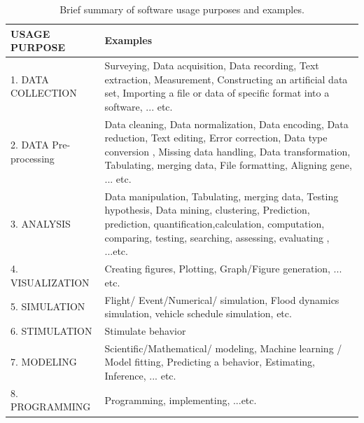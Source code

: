 \begin{table}
	\caption{Brief summary of software usage purposes and examples.}
	\begin{tabularx}{\textwidth}
		{|>{\setlength\hsize{.6\hsize}\setlength\linewidth{\hsize}}X|>{\setlength\hsize{1.4\hsize}\setlength\linewidth{\hsize}}X|}
		
		\hline
		USAGE PURPOSE & Examples  \\
		\hline
		1. DATA COLLECTION    &
		 
		Surveying, Data acquisition, Data recording, Text extraction, Measurement, Constructing an artificial data set, Importing a file or data of specific format into a software, ... etc.    \\
		\hline
		2. DATA Pre-processing    &
		
		Data cleaning, Data normalization,  Data encoding, Data reduction, Text editing, Error correction, Data type conversion , Missing data handling, Data transformation, Tabulating, merging data, File formatting, Aligning gene, ... etc.  \\
		\hline
		3. ANALYSIS    &
			
		Data manipulation, Tabulating, merging data, Testing hypothesis, Data mining,  clustering, Prediction, prediction, quantification,calculation, computation, comparing, testing, searching, assessing,  evaluating , ...etc. \\
		\hline
		
		4. VISUALIZATION    &
		
		Creating figures, Plotting, Graph/Figure generation, ... etc.		 \\
		\hline
		
		5. SIMULATION    &
		
		Flight/ Event/Numerical/ simulation,  Flood dynamics simulation,  vehicle schedule simulation, etc. \\
		\hline
		
		6. STIMULATION    &
			
		Stimulate behavior \\
		\hline
		7. MODELING    &
			
		Scientific/Mathematical/ modeling,  Machine learning / Model fitting, Predicting a behavior, Estimating, Inference, ... etc. \\
		\hline
		
		8. PROGRAMMING    &
		Programming, implementing, ...etc. \\
		\hline

	\end{tabularx}
\end{table}







